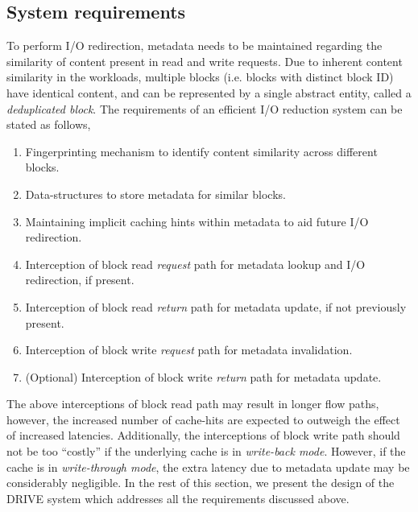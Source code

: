 \subsection{System requirements}
To perform I/O redirection, metadata needs to be maintained
regarding the similarity of content present in read and write requests. 
Due to inherent content similarity in the workloads,
multiple blocks (i.e. blocks with distinct block ID) have identical content,
and can be represented by a single abstract entity, called a 
\textit{deduplicated block}. The requirements of an efficient 
I/O reduction system can be stated as follows,
\begin{enumerate}
            \item Fingerprinting mechanism to identify content similarity across
                different blocks.
            \item Data-structures to store metadata for similar blocks.
            \item Maintaining implicit caching hints within metadata to aid
                future I/O redirection.
            \item Interception of block read \textit{request} path for 
                metadata lookup and I/O redirection, if present.
            \item Interception of block read \textit{return} path for
                metadata update, if not previously present.
            \item Interception of block write \textit{request} path for 
                metadata invalidation.
            \item (Optional) Interception of block write \textit{return} 
				path for metadata update.
\end{enumerate}
The above interceptions of block read path may result in longer flow paths,
however, the increased number of cache-hits are expected to outweigh
the effect of increased latencies.
Additionally, the interceptions of block write path should not be too ``costly''
if the underlying cache is in \textit{write-back mode}. However, 
if the cache is in \textit{write-through mode}, the extra latency
due to metadata update may be considerably negligible. 
In the rest of this section, we present the design of the DRIVE system
which addresses all the requirements discussed above.

